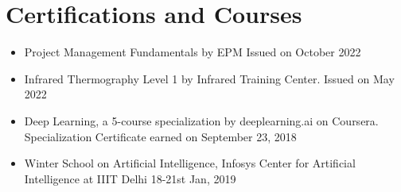 \documentclass{my_cv}%
\begin{document}
\section{Certifications and Courses}
\vspace{1em}
\begin{itemize}[leftmargin=0.15in]
\setlength\itemsep{-0.1em}
\color{mygray}
\item[\faCertificate] Project Management Fundamentals by EPM Issued on October 2022
\item[\faCertificate] Infrared Thermography Level 1 by Infrared Training Center. Issued on May 2022
\item[\faCertificate] Deep Learning, a 5-course specialization by deeplearning.ai on Coursera. Specialization Certificate earned on September 23, 2018
\item[\faCertificate] Winter School on Artificial Intelligence, Infosys Center for Artificial Intelligence at IIIT Delhi 18-21st Jan, 2019
\end{itemize}

\end{document}
